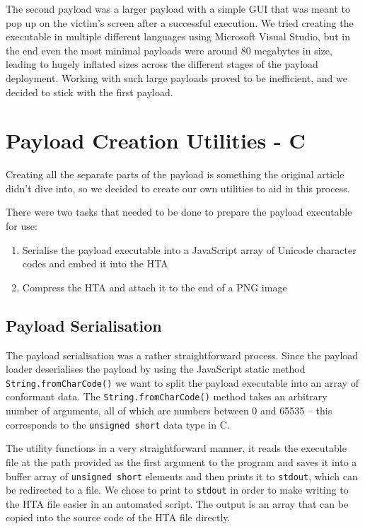 The second payload was a larger payload with a simple GUI that was meant to pop up on the victim's screen after a
successful execution. We tried creating the executable in multiple different languages using Microsoft Visual Studio,
but in the end even the most minimal payloads were around 80 megabytes in size, leading to hugely inflated sizes across 
the different stages of the payload deployment. Working with such large payloads proved to be inefficient, and we
decided to stick with the first payload.

\section{Payload Creation Utilities - C} \label{sec:impl-utilities}
Creating all the separate parts of the payload is something the original article didn't dive into, 
so we decided to create our own utilities to aid in this process. 

There were two tasks that needed to be done to prepare the payload executable for use: 
\begin{enumerate}
  \item Serialise the payload executable into a JavaScript array of Unicode character codes and embed it into the
    \acrfull{HTA}
  \item Compress the \acrshort{HTA} and attach it to the end of a \acrshort{PNG} image
\end{enumerate}

\subsection{Payload Serialisation}
The payload serialisation was a rather straightforward process. Since the payload loader deserialises the payload by
using the JavaScript static method \verb+String.fromCharCode()+ we want to split the payload executable into an array 
of conformant data. The \verb+String.fromCharCode()+ method takes an arbitrary number of arguments, all of which are
numbers between 0 and 65535 -- this corresponds to the \verb+unsigned short+ data type in C. 

The utility functions in a very straightforward manner, it reads the executable file at the path provided as the first 
argument to the program and saves it into a buffer array of \verb+unsigned short+ elements and then prints it to
\verb+stdout+, which can be redirected to a file. We chose to print to \verb+stdout+ in order to make writing to the
\acrshort{HTA} file easier in an automated script. The output is an array that can be copied into the source code of
the \acrshort{HTA} file directly.

